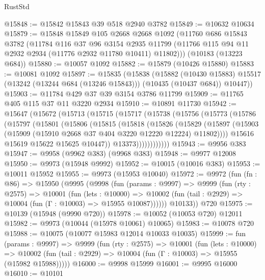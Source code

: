 \begin{lexlean}{RustStd}
\begin{coremodule}
@15848 := @15842 @15843 @39 @518 @2940 @3782
@15849 := @10632 @10634
@15879 := @15848
    @15849
    @105
    @2668
    @2668
    @1092
    (@11760
      @686
      @15843
      @3782
      (@11784
        @116
        @37
        @96
        @3154
        @2935
        @11799
        (@11766 @115 @94 @11 @2932 @2934 (@11776 @2932 @11780 @10411) @11802)))
    (@10183 (@13223 @684))
@15880 := @10057 @1092
@15882 := @15879 (@10426 @15880)
@15883 := @10081 @1092
@15897 := @15835
    (@15838
      (@15882
        (@10430 @15883)
        @15517
        (@13242 (@13244 @684 (@13246 @15843)))
        (@10435 (@10437 @684))
        @10447))
@15903 := @11784 @429 @37 @39 @3154 @3786 @11799
@15909 := @11765 @405 @115 @37 @11 @3220 @2934
@15910 := @10891 @11730
@15942 := @15647
    (@15672
      (@15713
        (@15715
          (@15717
            (@15738
              (@15756
                (@15773
                  (@15786
                    (@15797
                      (@15801
                        (@15806
                          (@15815
                            (@15818
                              (@15826
                                (@15829
                                  (@15897
                                    (@15903
                                      (@15909 (@15910 @2668 @37 @404 @3220 @12220 @12224) @11802))))
                                @15616
                                @15619
                                @15622
                                @15625
                                @10447))
                            @13373))))))))))))
@15943 := @9956 @383
@15947 := @9958 (@9962 @383) (@9968 @383)
@15948 := @9977 @12008
@15950 := @9973 (@15948 @9992)
@15952 := @10015 (@10016 @383)
@15953 := @10011 @15952
@15955 := @9973 (@15953 @10040)
@15972 := @9972
    (fun (fn : @86) =>
    @15950
      (@9995
        (@9998
          (fun (params : @9997) =>
          @9999
            (fun (rty : @2575) =>
            @10001
              (fun (lets : @10000) =>
              @10002 (fun (tail : @2929) => @10004 (fun (Γ : @10003) => @15955 @10087))))))
        @10133))
    @720
@15975 := @10139 (@15948 (@9990 @720))
@15978 := @10052 (@10053 @720) @12011
@15982 := @9973 (@10044 (@15978 @10061) @10065)
@15983 := @10078 @720
@15988 := @10075 (@10077 @15983 @12014 @10033 @10035)
@15999 := fun (params : @9997) =>
  @9999
    (fun (rty : @2575) =>
    @10001
      (fun (lets : @10000) =>
      @10002 (fun (tail : @2929) => @10004 (fun (Γ : @10003) => @15955 (@15982 @15988)))))
@16000 := @9998 @15999
@16001 := @9995 @16000
@16010 := @10101

\end{coremodule}
\end{lexlean}
